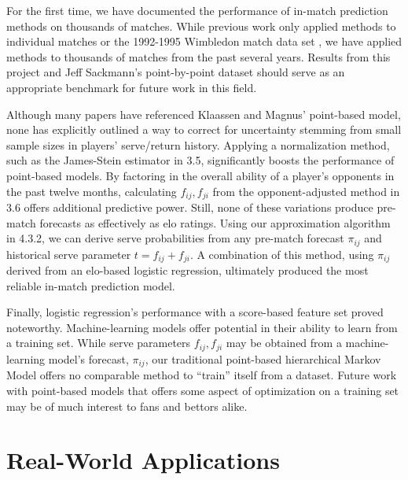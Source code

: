\documentclass[chapterprefix=false]{report}
\begin{document}
For the first time, we have documented the performance of in-match prediction methods on thousands of matches. While previous work only applied methods to individual matches or the 1992-1995 Wimbledon match data set \cite{KlaassenandMagnus2003}, we have applied methods to thousands of matches from the past several years. Results from this project and Jeff Sackmann's point-by-point dataset should serve as an appropriate benchmark for future work in this field.


Although many papers have referenced Klaassen and Magnus' point-based model, none has explicitly outlined a way to correct for uncertainty stemming from small sample sizes in players' serve/return history. Applying a normalization method, such as the James-Stein estimator in 3.5, significantly boosts the performance of point-based models. By factoring in the overall ability of a player's opponents in the past twelve months, calculating $f_{ij},f_{ji}$ from the opponent-adjusted method in 3.6 offers additional predictive power. Still, none of these variations produce pre-match forecasts as effectively as elo ratings. Using our approximation algorithm in 4.3.2, we can derive serve probabilities from any pre-match forecast $\pi_{ij}$ and historical serve parameter $t = f_{ij} + f_{ji}$. A combination of this method, using $\pi_{ij}$ derived from an elo-based logistic regression, ultimately produced the most reliable in-match prediction model.

Finally, logistic regression's performance with a score-based feature set proved noteworthy. Machine-learning models offer potential in their ability to learn from a training set. While serve parameters $f_{ij},f_{ji}$ may be obtained from a machine-learning model's forecast, $\pi_{ij}$, our traditional point-based hierarchical Markov Model offers no comparable method to ``train'' itself from a dataset. Future work with point-based models that offers some aspect of optimization on a training set may be of much interest to fans and bettors alike.

\section{Real-World Applications}
\end{document}
